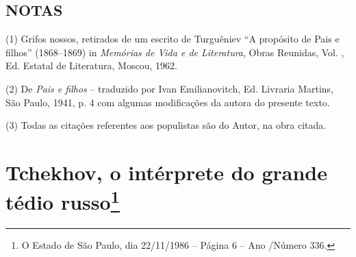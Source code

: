 \section{NOTAS}

(1) Grifos nossos, retirados de um escrito de Turguêniev ``A propósito
de Pais e filhos'' (1868--1869) in \emph{Memórias de Vida e de
Literatura}, Obras Reunidas, Vol. , Ed. Estatal de Literatura, Moscou,
1962.

(2) De \emph{Pais e filhos} -- traduzido por Ivan Emilianovitch, Ed.
Livraria Martins, São Paulo, 1941, p. 4 com algumas modificações da autora
do presente texto.

(3) Todas as citações referentes aos populistas são do Autor, na obra
citada.

\chapter{Tchekhov, o intérprete do grande tédio russo\footnote{O Estado
  de São Paulo, dia 22/11/1986 -- Página 6 -- Ano /Número 336.}}

